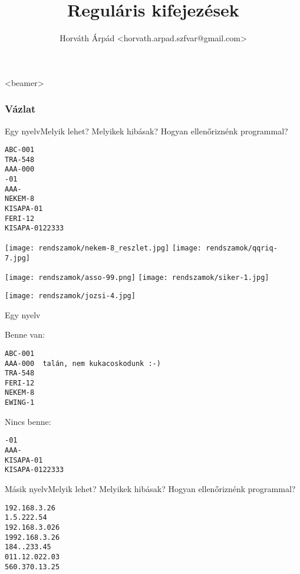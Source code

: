\documentclass[
    ignorenonframetext
    ]{beamer}
\title{Regul\'aris kifejez\'esek}
\subtitle{}
\author{Horváth Árpád <horvath.arpad.szfvar@gmail.com>}
\institute[]{}
\begin{document}
\frame{\maketitle}

\begin{frame}<beamer>
  \frametitle{Vázlat}
  \tableofcontents
\end{frame}

\begin{frame}[fragile]
    {Egy nyelv}{Melyik lehet? Melyikek hibásak? Hogyan ellenőriznénk programmal?}

\begin{verbatim}
ABC-001
TRA-548
AAA-000
-01
AAA-
NEKEM-8
KISAPA-01
FERI-12
KISAPA-0122333
\end{verbatim}
\end{frame}

\begin{frame}
    \noindent
    \texttt{[image: rendszamok/nekem-8\_reszlet.jpg]} 
    \texttt{[image: rendszamok/qqriq-7.jpg]} 

    \noindent
    \texttt{[image: rendszamok/asso-99.png]} 
    \texttt{[image: rendszamok/siker-1.jpg]} 
\end{frame}

\begin{frame}
    \noindent
    \texttt{[image: rendszamok/jozsi-4.jpg]} 
\end{frame}

\begin{frame}[fragile]
    {Egy nyelv}

Benne van:
\begin{verbatim}
ABC-001
AAA-000  talán, nem kukacoskodunk :-)
TRA-548
FERI-12
NEKEM-8
EWING-1
\end{verbatim}

Nincs benne:
\begin{verbatim}
-01
AAA-
KISAPA-01
KISAPA-0122333
\end{verbatim}
\end{frame}

\begin{frame}[fragile]
    {Másik nyelv}{Melyik lehet? Melyikek hibásak? Hogyan ellenőriznénk programmal?}

\begin{verbatim}
192.168.3.26
1.5.222.54
192.168.3.026
1992.168.3.26
184..233.45
011.12.022.03
560.370.13.25
\end{verbatim}
\end{frame}
\end{document}
